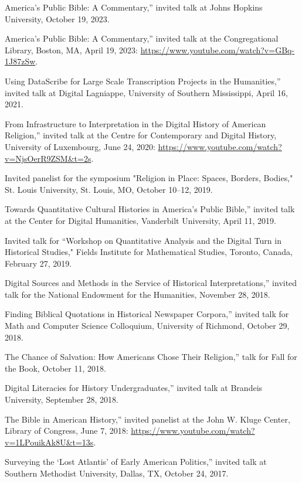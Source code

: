 \documentclass[11pt]{article}
\begin{document}
\noindent{}America's Public Bible: A Commentary,'' invited talk at Johns 
Hopkins University, October 19, 2023.

\noindent{}America's Public Bible: A Commentary,'' invited talk at the Congregational Library, Boston, MA, April 19, 2023: \url{https://www.youtube.com/watch?v=GBq-1J87zSw}.

\noindent{}Using DataScribe for Large Scale Transcription Projects in the Humanities,'' invited talk at Digital Lagniappe, University of Southern Mississippi, April 16, 2021.

\noindent{}From Infrastructure to Interpretation in the Digital History of American Religion,'' invited talk at the Centre for Contemporary and Digital History, University of Luxembourg, June 24, 2020: \url{https://www.youtube.com/watch?v=NjsOerR9ZSM&t=2s}.

Invited panelist for the symposium "Religion in Place: Spaces, Borders, Bodies," St. Louis University, St. Louis, MO, October 10--12, 2019.

\noindent{}Towards Quantitative Cultural Histories in America's Public Bible,'' invited talk at the Center for Digital Humanities, Vanderbilt University, April 11, 2019.

Invited talk for ``Workshop on Quantitative Analysis and the Digital Turn in Historical Studies," Fields Institute for Mathematical Studies, Toronto, Canada, February 27, 2019.

\noindent{}Digital Sources and Methods in the Service of Historical Interpretations,'' invited talk for the National Endowment for the Humanities, November 28, 2018.

\noindent{}Finding Biblical Quotations in Historical Newspaper Corpora,'' invited talk for Math and Computer Science Colloquium, University of Richmond, October 29, 2018.

\noindent{}The Chance of Salvation: How Americans Chose Their Religion,'' talk for Fall for the Book, October 11, 2018.

\noindent{}Digital Literacies for History Undergraduates,'' invited talk at Brandeis University, September 28, 2018.

\noindent{}The Bible in American History,'' invited panelist at the John W. Kluge Center, Library of Congress, June 7, 2018: \url{https://www.youtube.com/watch?v=1LPouikAk8U&t=13s}.

\noindent{}Surveying the `Lost Atlantis' of Early American Politics,'' invited talk at Southern Methodist University, Dallas, TX, October 24, 2017.
\end{document}
